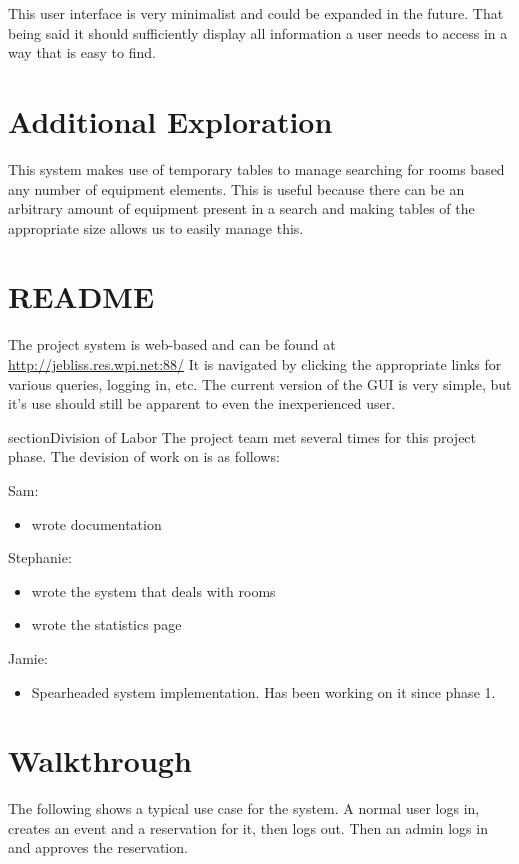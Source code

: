 \documentclass{article}
\begin{document}
This user interface is very minimalist and could be expanded in the future. That being said it should sufficiently display
all information a user needs to access in a way that is easy to find.

\section{Additional Exploration}
This system makes use of temporary tables to manage searching for rooms based any number of equipment elements. This is
useful because there can be an arbitrary amount of equipment present in a search and making tables of the appropriate size
allows us to easily manage this.

\section{README}
The project system is web-based and can be found at \url{http://jebliss.res.wpi.net:88/}
It is navigated by clicking the appropriate links for various queries, logging in, etc.
The current version of the GUI is very simple, but it's use should still be apparent to even the inexperienced user.



section{Division of Labor}
The project team met several times for this project phase. The devision of work on is as follows:

Sam:
\begin{itemize}
\item wrote documentation
\end{itemize}

Stephanie:
\begin{itemize}
\item wrote the system that deals with rooms
\item wrote the statistics page
\end{itemize}

Jamie:
\begin{itemize}
\item Spearheaded system implementation. Has been working on it since phase 1.
\end{itemize}

\appendix
\section{Walkthrough}
The following shows a typical use case for the system.
A normal user logs in, creates an event and a reservation for it, then logs out.
Then an admin logs in and approves the reservation.
\end{document}
